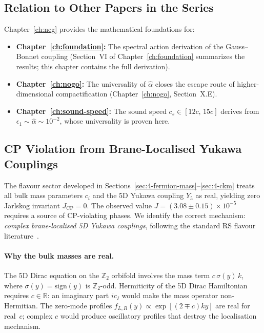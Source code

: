 \subsection{Relation to Other Papers in the Series}
\label{sec:4-relation}

Chapter~\ref{ch:ncg} provides the mathematical foundations for:
\begin{itemize}
  \item \textbf{Chapter~\ref{ch:foundation}:} The spectral action derivation of the Gauss--Bonnet coupling (Section~VI of Chapter~\ref{ch:foundation} summarizes the results; this chapter contains the full derivation).
  \item \textbf{Chapter~\ref{ch:nogo}:} The universality of $\hat{\alpha}$ closes the escape route of higher-dimensional compactification (Chapter~\ref{ch:nogo}, Section~X.E).
  \item \textbf{Chapter~\ref{ch:sound-speed}:} The sound speed $c_s \in [12c,\, 15c]$ derives from $\epsilon_1 \sim \hat{\alpha} \sim 10^{-2}$, whose universality is proven here.
\end{itemize}


\subsection{CP Violation from Brane-Localised Yukawa Couplings}
\label{sec:4-cp-mechanism}

The flavour sector developed in Sections~\ref{sec:4-fermion-mass}--\ref{sec:4-ckm} treats all bulk mass parameters $c_i$ and the 5D Yukawa coupling $Y_5$ as real, yielding zero Jarlskog invariant $J_{\mathrm{CP}} = 0$.  The observed value $J = (3.08 \pm 0.15) \times 10^{-5}$ requires a source of CP-violating phases.  We identify the correct mechanism: \emph{complex brane-localised 5D Yukawa couplings}, following the standard RS flavour literature~\cite{ch4:GherghettaPomarol2000,ch4:Huber2003,ch4:AgashePerezSoni2005,ch4:Casagrande2008}.

\paragraph{Why the bulk masses are real.}
The 5D Dirac equation on the $\mathbb{Z}_2$ orbifold involves the mass term $c\,\sigma(y)\,k$, where $\sigma(y) = \mathrm{sign}(y)$ is $\mathbb{Z}_2$-odd.  Hermiticity of the 5D Dirac Hamiltonian requires $c \in \mathbb{R}$: an imaginary part $ic_I$ would make the mass operator non-Hermitian.  The zero-mode profiles $f_{L,R}(y) \propto \exp[(2 \mp c)ky]$ are real for real~$c$; complex $c$ would produce oscillatory profiles that destroy the localisation mechanism.

